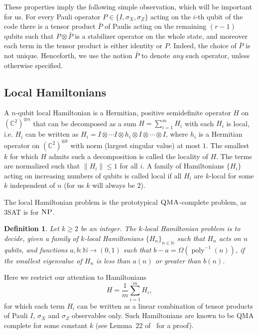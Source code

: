 \documentclass[11pt,letterpaper]{article}
\newcommand{\<}{\langle}
\renewcommand{\>}{\rangle}
\newtheorem{definition}[theorem]{Definition}
\newcommand{\NP}{\textsc{NP}}
\newcommand{\QMA}{\textsc{QMA}}
\DeclareMathOperator{\poly}{poly}
\newcommand{\C}{\mathbb{C}}
\newcommand{\R}{\mathbb{R}}
\newcommand{\N}{\mathbb{N}}
\begin{document}
These properties imply the following simple observation,
which will be important for us. For every Pauli operator $P\in\{I,\sigma_X,\sigma_Z\}$ acting on the $i$-th qubit of the code there is a tensor product $\bar{P}$ of Paulis acting on the remaining $(r - 1)$ qubits such that $P \otimes \bar{P}$ is a stabilizer
operator on the whole state, and moreover each term in the tensor
product is either identity or $P$. Indeed, the choice of $\bar{P}$ is not unique. Henceforth, we use the
notion $\bar{P}$ to denote \emph{any} such operator, unless
otherwise specified. 

\subsection{Local Hamiltonians}\label{sec:local-h}

A $n$-qubit local Hamiltonian is a Hermitian, positive semidefinite  operator $H$ on $(\C^2)^{\otimes {n}}$ that can be decomposed as a sum $H = \sum_{i=1}^m H_i$ with each $H_i$ is local, i.e. $H_i$ can be written as $H_i = I\otimes\cdots I \otimes h_i \otimes I \otimes \cdots \otimes I$, where $h_i$ is a Hermitian operator on $(\C^2)^{\otimes k}$ with norm (largest singular value) at most $1$. The smallest $k$ for which $H$ admits such a decomposition is called the locality of $H$. The terms are normalized such that $\| H_i\| \leq 1$ for all $i$. A family of Hamiltonians $\{H_i\}$ acting on increasing numbers of qubits is called local if all $H_i$ are $k$-local for some $k$ independent of $n$ (for us $k$ will always be $2$).

The local Hamiltonian problem is the prototypical $\QMA$-complete problem, as 3SAT is for $\NP$. 

\begin{definition}
Let $k\geq 2$ be an integer. 
  The $k$-\emph{local Hamiltonian problem} is to decide, given a
  family of $k$-local Hamiltonians $\{H_n\}_{n\in\N}$ such that $H_n$ acts on $n$ qubits, and functions $a,b:\N\to (0,1)$ such that $b - a = \Omega( \poly^{-1}(n))$, if the smallest eigenvalue
  of $H_n$ is less than $a(n)$ or greater than $b(n)$.
\end{definition}

Here we restrict our attention to Hamiltonians 
\[ H = \frac{1}{m} \sum_{i=1}^{m} H_i, \]
for which each term $H_i$ can be written as a linear combination of
tensor products of Pauli $I$, $\sigma_X$ and $\sigma_Z$ observables only. Such
Hamiltonians are known to be QMA complete for some constant $k$ (see Lemma~22
of~\cite{ji2015classical} for a proof).
\end{document}
